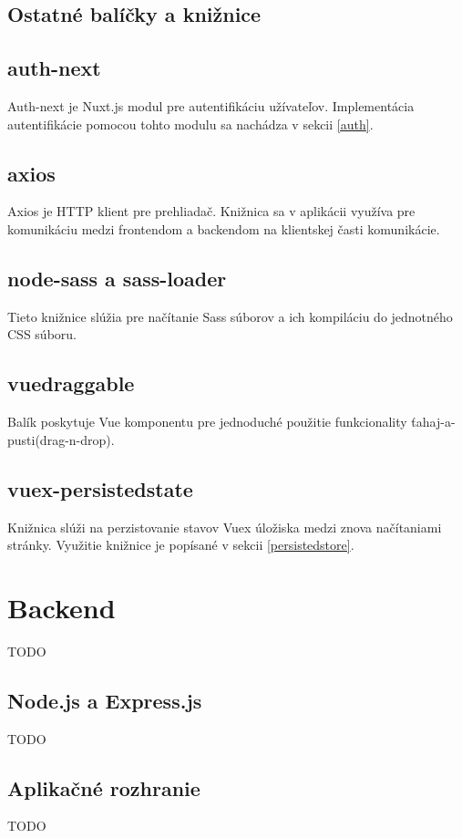 \subsection{Ostatné balíčky a knižnice}
\subsection*{auth-next}
Auth-next je Nuxt.js modul pre autentifikáciu užívateľov. Implementácia autentifikácie pomocou tohto modulu sa nachádza v sekcii \ref{auth}.

\subsection*{axios}
Axios je HTTP klient pre prehliadač. Knižnica sa v aplikácii využíva pre komunikáciu medzi frontendom a backendom na klientskej časti komunikácie. 

\subsection*{node-sass a sass-loader}
Tieto knižnice slúžia pre načítanie Sass súborov a ich kompiláciu do jednotného CSS súboru.

\subsection*{vuedraggable}
Balík poskytuje Vue komponentu pre jednoduché použitie funkcionality ťahaj-a-pusti(drag-n-drop).

\subsection*{vuex-persistedstate}
Knižnica slúži na perzistovanie stavov Vuex úložiska medzi znova načítaniami stránky. Využitie knižnice je popísané v sekcii \ref{persistedstore}.

\section{Backend}
TODO

\subsection{Node.js a Express.js}
\label{node}
TODO

\subsection{Aplikačné rozhranie}
TODO

